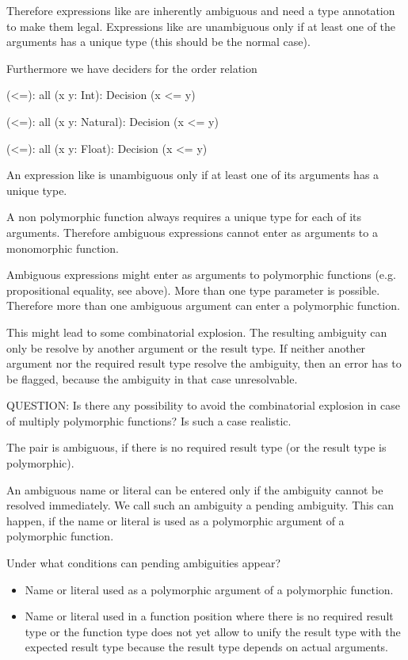 Therefore expressions like  are inherently ambiguous and need a
type annotation to make them legal. Expressions like  are
unambiguous only if at least one of the arguments has a unique type (this should
be the normal case).

Furthermore we have deciders for the order relation

\begin{alba}
    (<=): all (x y: Int): Decision (x <= y)

    (<=): all (x y: Natural): Decision (x <= y)

    (<=): all (x y: Float): Decision (x <= y)
\end{alba}

An expression like  is unambiguous only if at least one
of its arguments has a unique type.

A non polymorphic function always requires a unique type for each of its
arguments. Therefore ambiguous expressions cannot enter as arguments to a
monomorphic function.

Ambiguous expressions might enter as arguments to polymorphic functions (e.g.
propositional equality, see above). More than one type parameter is possible.
Therefore more than one ambiguous argument can enter a polymorphic function.

This might lead to some combinatorial explosion. The resulting ambiguity can
only be resolve by another argument or the result type. If neither another
argument nor the required result type resolve the ambiguity, then an error has
to be flagged, because the ambiguity in that case unresolvable.

QUESTION: Is there any possibility to avoid the combinatorial explosion in case
of multiply polymorphic functions? Is such a case realistic.

The pair  is ambiguous, if there is no required result type (or the
result type is polymorphic).

An ambiguous name or literal can be entered only if the ambiguity cannot be
resolved immediately. We call such an ambiguity a pending ambiguity. This can
happen, if the name or literal is used as a polymorphic argument of a
polymorphic function.

Under what conditions can pending ambiguities appear?
\begin{itemize}

\item Name or literal used as a polymorphic argument of a polymorphic function.

\item Name or literal used in a function position where there is no required
result type or the function type does not yet allow to unify the result type
with the expected result type because the result type depends on actual
arguments.

\end{itemize}





